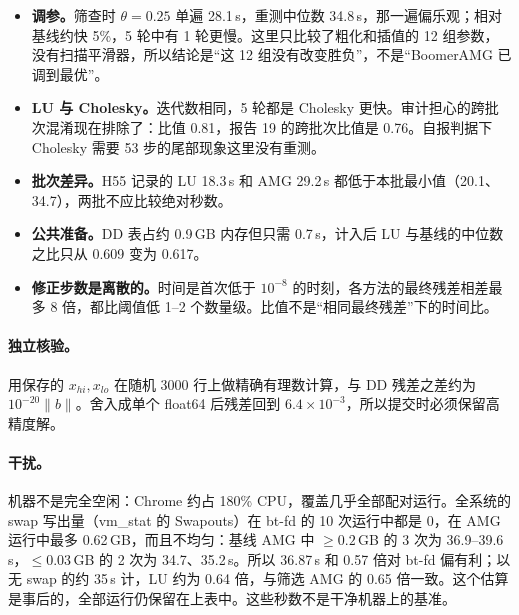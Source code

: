 \documentclass[11pt,a4paper]{ctexart}
\begin{document}
\begin{itemize}
\item \textbf{调参。}筛查时 $\theta=0.25$ 单遍 28.1\,s，重测中位数 34.8\,s，那一遍偏乐观；相对基线约快 5\%，5 轮中有 1 轮更慢。这里只比较了粗化和插值的 12 组参数，没有扫描平滑器，所以结论是“这 12 组没有改变胜负”，不是“BoomerAMG 已调到最优”。
\item \textbf{LU 与 Cholesky。}迭代数相同，5 轮都是 Cholesky 更快。审计担心的跨批次混淆现在排除了：比值 0.81，报告 19 的跨批次比值是 0.76。自报判据下 Cholesky 需要 53 步的尾部现象这里没有重测。
\item \textbf{批次差异。}H55 记录的 LU 18.3\,s 和 AMG 29.2\,s 都低于本批最小值（20.1、34.7），两批不应比较绝对秒数。
\item \textbf{公共准备。}DD 表占约 0.9\,GB 内存但只需 0.7\,s，计入后 LU 与基线的中位数之比只从 0.609 变为 0.617。
\item \textbf{修正步数是离散的。}时间是首次低于 $10^{-8}$ 的时刻，各方法的最终残差相差最多 8 倍，都比阈值低 1--2 个数量级。比值不是“相同最终残差”下的时间比。
\end{itemize}

\paragraph{独立核验。}用保存的 $x_{hi},x_{lo}$ 在随机 3000 行上做精确有理数计算，与 DD 残差之差约为 $10^{-20}\|b\|$。舍入成单个 float64 后残差回到 $6.4\times10^{-3}$，所以提交时必须保留高精度解。

\paragraph{干扰。}机器不是完全空闲：Chrome 约占 180\% CPU，覆盖几乎全部配对运行。全系统的 swap 写出量（vm\_stat 的 Swapouts）在 bt-fd 的 10 次运行中都是 0，在 AMG 运行中最多 0.62\,GB，而且不均匀：基线 AMG 中 $\ge0.2$\,GB 的 3 次为 36.9--39.6\,s，$\le0.03$\,GB 的 2 次为 34.7、35.2\,s。所以 36.87\,s 和 0.57 倍对 bt-fd 偏有利；以无 swap 的约 35\,s 计，LU 约为 0.64 倍，与筛选 AMG 的 0.65 倍一致。这个估算是事后的，全部运行仍保留在上表中。这些秒数不是干净机器上的基准。
\end{document}
